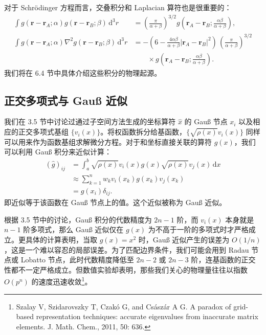 对于 Schrödinger 方程而言，交叠积分和 Laplacian 算符也是很重要的：
\begin{equation}
\begin{aligned}
\int g(\bm r-\bm r_A;\alpha)g(\bm r-\bm r_B;\beta)\,\mathrm d^3r
&=\left(\frac\pi{\alpha+\beta}\right)^{3/2}
 g\!\left(\bm r_A-\bm r_B;\frac{\alpha\beta}{\alpha+\beta}\right),\\
\int g(\bm r-\bm r_A;\alpha)\nabla^2 g(\bm r-\bm r_B;\beta)\,\mathrm d^3r
&=-\left(6-\frac{4\alpha\beta}{\alpha+\beta}|\bm r_A-\bm r_B|^2\right)\,\left(\frac\pi{\alpha+\beta}\right)^{3/2}\\
&\qquad\times g\!\left(\bm r_A-\bm r_B;\frac{\alpha\beta}{\alpha+\beta}\right).
\end{aligned}
\tag{5.4.44}
\end{equation}
我们将在 6.4 节中具体介绍这些积分的物理起源。

\subsection{正交多项式与 Gauß 近似}

我们在 3.5 节中讨论过通过子空间方法生成的坐标算符 $\hat x$ 的 Gauß 节点 $x_i$ 以及相应的正交多项式基组 $\{v_i(x)\}$。将权函数拆分给基函数，$\{\sqrt{\rho(x)}v_i(x)\}$ 同样可以用来作为函数基组求解微分方程。对于和坐标直接关联的算符 $g(x)$，我们可以利用 Gauß 积分来近似计算：
\begin{equation}
\begin{aligned}
(\hat g)_{ij}
&=\int_a^b\sqrt{\rho(x)}v_i(x)g(x)\sqrt{\rho(x)}v_j(x)\,\mathrm dx\\
&\approx\sum_{k=1}^n w_k v_i(x_k)g(x_k)v_j(x_k)\\
&=g(x_i)\delta_{ij}.
\end{aligned}
\tag{5.4.45}
\end{equation}
即近似等于该函数在 Gauß 节点上的值。这个近似被称为 Gauß 近似。

根据 3.5 节中的讨论，Gauß 积分的代数精度为 $2n-1$ 阶，而 $v_i(x)$ 本身就是 $n-1$ 阶多项式，那么 Gauß 近似仅在 $g(x)$ 为不高于一阶的多项式时才严格成立。更具体的计算表明，当取 $g(x)=x^2$ 时，Gauß 近似产生的误差为 $O(1/n)$，这是一个难以容忍的局部误差。为了匹配边界条件，我们可能会用到 Radau 节点或 Lobatto 节点，此时代数精度降低至 $2n-2$ 或 $2n-3$ 阶，连基函数的正交性都不一定严格成立。但数值实验却表明，那些我们关心的物理量往往以指数 $O(p^n)$ 的速度迅速收敛\footnote{Szalay V, Szidarovszky T, Czakó G, and Császár A G. A paradox of grid-based representation techniques: accurate eigenvalues from inaccurate matrix elements. J. Math. Chem., 2011, 50: 636.}。

